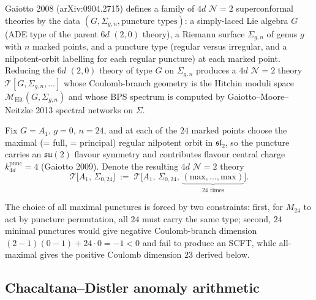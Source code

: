 Gaiotto 2008 (arXiv:0904.2715) defines a family of $4d$ $\mathcal{N}=2$
superconformal theories by the data $(G,\Sigma_{g,n},\text{puncture types})$:
a simply-laced Lie algebra $G$ (ADE type of the parent $6d$ $(2,0)$ theory),
a Riemann surface $\Sigma_{g,n}$ of genus $g$ with $n$ marked points, and a
puncture type (regular versus irregular, and a nilpotent-orbit labelling for
each regular puncture) at each marked point. Reducing the $6d$ $(2,0)$ theory
of type $G$ on $\Sigma_{g,n}$ produces a $4d$ $\mathcal{N}=2$ theory
$\mathcal{T}[G,\Sigma_{g,n},\ldots]$ whose Coulomb-branch geometry is the
Hitchin moduli space $\mathcal{M}_{\mathrm{Hit}}(G,\Sigma_{g,n})$ and whose
BPS spectrum is computed by Gaiotto--Moore--Neitzke 2013 spectral networks
on $\Sigma$.

\begin{definition}
\label{def:classS-A1-Sigma024}
Fix $G = A_1$, $g = 0$, $n = 24$, and at each of the $24$ marked points choose
the maximal (= full, = principal) regular nilpotent orbit in $\mathfrak{sl}_2$,
so the puncture carries an $\mathfrak{su}(2)$ flavour symmetry and contributes
flavour central charge $k_{4d}^{\mathrm{punc}} = 4$ (Gaiotto 2009). Denote the
resulting $4d$ $\mathcal{N}=2$ theory
\[
 \mathcal{T}\bigl[A_1,\,\Sigma_{0,24}\bigr]
 \;:=\;
 \mathcal{T}\bigl[A_1,\,\Sigma_{0,24},\,
 \underbrace{(\mathrm{max},\ldots,\mathrm{max})}_{24\text{ times}}\bigr].
\]
\end{definition}

The choice of all maximal punctures is forced by two constraints: first, for
$M_{24}$ to act by puncture permutation, all $24$ must carry the same type;
second, $24$ minimal punctures would give negative Coulomb-branch dimension
$(2-1)(0-1) + 24\cdot 0 = -1 < 0$ and fail to produce an SCFT, while
all-maximal gives the positive Coulomb dimension $23$ derived below.

\subsection{Chacaltana--Distler anomaly arithmetic}
\label{subsec:k3-CD-anomaly-arithmetic}


